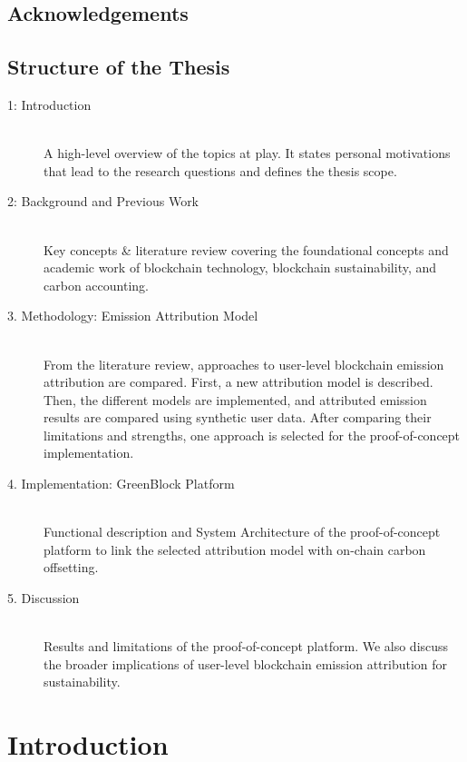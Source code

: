 \documentclass[11pt]{report}
\begin{document}
\newpage
\section*{Acknowledgements}
\tableofcontents



\newpage

\section*{Structure of the Thesis}


\begin{description}
    \item [1: Introduction] \hfill \\
          A high-level overview of the topics at play. It states personal motivations that lead to the research questions and defines the thesis scope.
    \item [2: Background and Previous Work] \hfill \\
          Key concepts \& literature review covering the foundational concepts and academic work of blockchain technology, blockchain sustainability, and carbon accounting.
    \item [3. Methodology: Emission Attribution Model] \hfill \\
          From the literature review, approaches to user-level blockchain emission attribution are compared. First, a new attribution model is described. Then, the different models are implemented, and attributed emission results are compared using synthetic user data. After comparing their limitations and strengths, one approach is selected for the proof-of-concept implementation.
    \item [4. Implementation: GreenBlock Platform] \hfill \\
          Functional description and System Architecture of the proof-of-concept platform to link the selected attribution model with on-chain carbon offsetting.
    \item [5. Discussion] \hfill \\
          Results and limitations of the proof-of-concept platform. We also discuss the broader implications of user-level blockchain emission attribution for sustainability.

\end{description}

\printacronyms
\printglossary

\chapter{Introduction}
\end{document}
